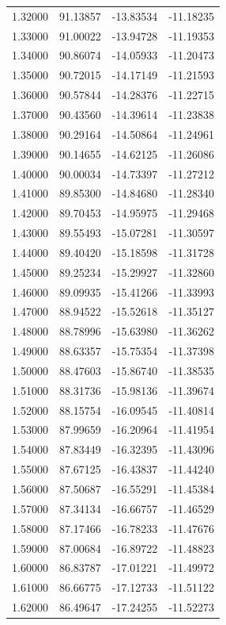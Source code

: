 \begin{table}
\begin{tabular}{llll}
1.32000 & 91.13857 & -13.83534 & -11.18235 \\
1.33000 & 91.00022 & -13.94728 & -11.19353 \\
1.34000 & 90.86074 & -14.05933 & -11.20473 \\
1.35000 & 90.72015 & -14.17149 & -11.21593 \\
1.36000 & 90.57844 & -14.28376 & -11.22715 \\
1.37000 & 90.43560 & -14.39614 & -11.23838 \\
1.38000 & 90.29164 & -14.50864 & -11.24961 \\
1.39000 & 90.14655 & -14.62125 & -11.26086 \\
1.40000 & 90.00034 & -14.73397 & -11.27212 \\
1.41000 & 89.85300 & -14.84680 & -11.28340 \\
1.42000 & 89.70453 & -14.95975 & -11.29468 \\
1.43000 & 89.55493 & -15.07281 & -11.30597 \\
1.44000 & 89.40420 & -15.18598 & -11.31728 \\
1.45000 & 89.25234 & -15.29927 & -11.32860 \\
1.46000 & 89.09935 & -15.41266 & -11.33993 \\
1.47000 & 88.94522 & -15.52618 & -11.35127 \\
1.48000 & 88.78996 & -15.63980 & -11.36262 \\
1.49000 & 88.63357 & -15.75354 & -11.37398 \\
1.50000 & 88.47603 & -15.86740 & -11.38535 \\
1.51000 & 88.31736 & -15.98136 & -11.39674 \\
1.52000 & 88.15754 & -16.09545 & -11.40814 \\
1.53000 & 87.99659 & -16.20964 & -11.41954 \\
1.54000 & 87.83449 & -16.32395 & -11.43096 \\
1.55000 & 87.67125 & -16.43837 & -11.44240 \\
1.56000 & 87.50687 & -16.55291 & -11.45384 \\
1.57000 & 87.34134 & -16.66757 & -11.46529 \\
1.58000 & 87.17466 & -16.78233 & -11.47676 \\
1.59000 & 87.00684 & -16.89722 & -11.48823 \\
1.60000 & 86.83787 & -17.01221 & -11.49972 \\
1.61000 & 86.66775 & -17.12733 & -11.51122 \\
1.62000 & 86.49647 & -17.24255 & -11.52273 \\

\end{tabular}
\end{table}
